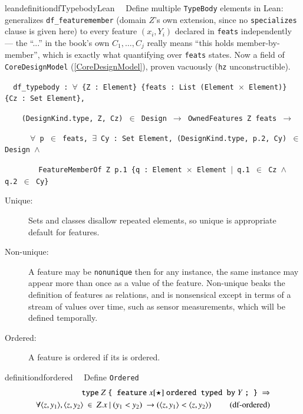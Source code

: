 \begin{restatable}{leandefinition}{dfTypebodyLean}~~ Define multiple \texttt{TypeBody}
elements in Lean: generalizes \texttt{df\_featuremember} (domain $Z$'s own extension, since no
\texttt{specializes} clause is given here) to every feature $(x_i,Y_i)$ declared in \texttt{feats}
independently --- the ``...'' in the book's own $C_1,\ldots,C_j$ really means ``this holds
member-by-member'', which is exactly what quantifying over \texttt{feats} states. Now a field of
\texttt{CoreDesignModel} (\ref{CoreDesignModel}), proven vacuously (\texttt{hz} unconstructible).

\texttt{~~df\_typebody : $\forall$ \{Z : Element\} \{feats : List (Element $\times$ Element)\} \{Cz : Set Element\},}

\texttt{~~~~(DesignKind.type, Z, Cz) $\in$ Design $\to$ OwnedFeatures Z feats $\to$}

\texttt{~~~~~~$\forall$ p $\in$ feats, $\exists$ Cy : Set Element, (DesignKind.type, p.2, Cy) $\in$ Design $\wedge$}

\texttt{~~~~~~~~FeatureMemberOf Z p.1 \{q : Element $\times$ Element $\vert$ q.1 $\in$ Cz $\wedge$ q.2 $\in$ Cy\}}
\label{df_typebody}
\end{restatable}

\begin{description}
\item[Unique: ] Sets and classes disallow repeated elements, so unique is appropriate default for features.
\item[Non-unique: ] A feature may be \texttt{nonunique} then for any  instance, the same  instance may appear more than once as a value of the feature.
Non-unique beaks the definition of features as relations, and is nonsensical except in terms of a stream of values over time, such as sensor measurements, which will be defined temporally. 
\item[Ordered: ] A feature is ordered if its  is ordered.
\end{description}

\begin{restatable}{definition}{dfordered}~~  Define \texttt{Ordered}
\begin{align}
\texttt{type}~ Z ~\texttt{\{ feature}~ x[\star] ~\texttt{ordered typed by}~ Y~\texttt{; \}}~\Rightarrow  \notag \\
\forall \langle z,y_1\rangle, \langle z,y_2\rangle~\in~Z.x~\vert~(y_1<y_2)~\rightarrow ( \langle z,y_1\rangle< \langle z,y_2\rangle)~\label{eq:df-ordered}\tag{df-ordered}
\end{align}
\end{restatable}

